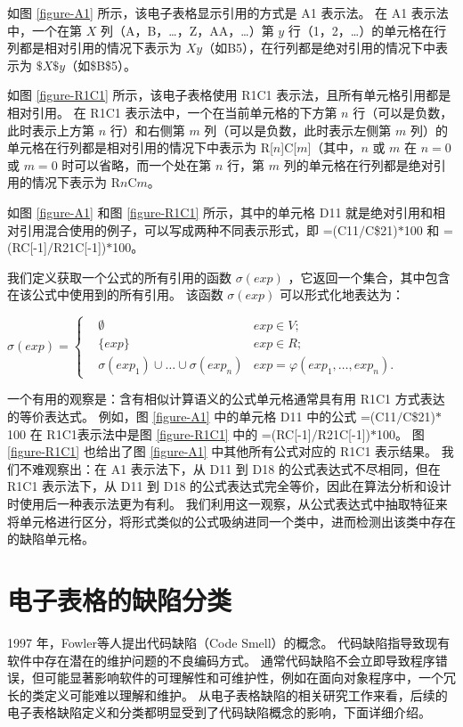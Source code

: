 

如图 \ref{figure-A1} 所示，该电子表格显示引用的方式是 A1 表示法。
在 A1 表示法中，一个在第 $X$ 列（A，B，\dots，Z，AA，\dots）第 $y$ 行（1，2，\dots）的单元格在行列都是相对引用的情况下表示为 $Xy$（如B5），在行列都是绝对引用的情况下中表示为 $\$X\$y$（如\$B\$5）。



如图 \ref{figure-R1C1} 所示，该电子表格使用 R1C1 表示法，且所有单元格引用都是相对引用。
在 R1C1 表示法中，一个在当前单元格的下方第 $n$ 行（可以是负数，此时表示上方第 $n$ 行）和右侧第 $m$ 列（可以是负数，此时表示左侧第 $m$ 列）的单元格在行列都是相对引用的情况下中表示为 R[$n$]C[$m$]（其中，$n$ 或 $m$ 在 $n=0$ 或 $m=0$ 时可以省略，而一个处在第 $n$ 行，第 $m$ 列的单元格在行列都是绝对引用的情况下表示为 R$n$C$m$。

如图 \ref{figure-A1} 和图 \ref{figure-R1C1} 所示，其中的单元格 D11 就是绝对引用和相对引用混合使用的例子，可以写成两种不同表示形式，即 =(C11$/$C\$21)$*$100 和 =(RC[-1]$/$R21C[-1])$*$100。

我们定义获取一个公式的所有引用的函数 $\sigma(exp)$ ，它返回一个集合，其中包含在该公式中使用到的所有引用。
该函数 $\sigma(exp)$ 可以形式化地表达为：
\begin{definition}
$
\sigma(exp) = 
\left\{
    \begin{aligned}
       & \emptyset & exp \in V; \\
       & \{exp\}     & exp \in R; \\
       & \sigma(exp_1) \cup \dots \cup \sigma(exp_n) & exp = \varphi(exp_1, \dots , exp_n).
    \end{aligned}
\right.
$
\end{definition}

一个有用的观察是：含有相似计算语义的公式单元格通常具有用 R1C1 方式表达的等价表达式。
例如，图 \ref{figure-A1} 中的单元格 D11 中的公式 =(C11$/$C\$21)$*$100 在 R1C1表示法中是图 \ref{figure-R1C1} 中的 =(RC[-1]$/$R21C[-1])$*$100。
图 \ref{figure-R1C1} 也给出了图 \ref{figure-A1} 中其他所有公式对应的 R1C1 表示结果。
我们不难观察出：在 A1 表示法下，从 D11 到 D18 的公式表达式不尽相同，但在 R1C1 表示法下，从 D11 到 D18 的公式表达式完全等价，因此在算法分析和设计时使用后一种表示法更为有利。
我们利用这一观察，从公式表达式中抽取特征来将单元格进行区分，将形式类似的公式吸纳进同一个类中，进而检测出该类中存在的缺陷单元格。


\section{电子表格的缺陷分类}
1997 年，Fowler等人\cite{fowler1997refactoring}提出代码缺陷（Code Smell）的概念。
代码缺陷指导致现有软件中存在潜在的维护问题的不良编码方式。
通常代码缺陷不会立即导致程序错误，但可能显著影响软件的可理解性和可维护性，例如在面向对象程序中，一个冗长的类定义可能难以理解和维护。
从电子表格缺陷的相关研究工作来看，后续的电子表格缺陷定义和分类都明显受到了代码缺陷概念的影响，下面详细介绍。

